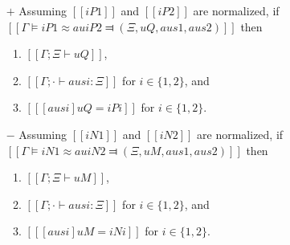 \begin{lemma} \label{lemma:anti-unification-soundness}
    \hfill
    \begin{itemize}
        \item [$+$]  Assuming $[[iP1]]$ and $[[iP2]]$ are normalized,
        if $[[Γ ⊨ iP1 ≈au iP2 ⫤ (Ξ, uQ, aus1, aus2)]]$
        then 
        \begin{enumerate}
            \item $[[Γ ; Ξ ⊢ uQ]]$,
            \item $[[Γ ; · ⊢ ausi : Ξ]]$ for $i \in \{1,2\}$, and
            \item $[[ [ausi] uQ = iPi ]]$ for $i \in \{1,2\}$.
        \end{enumerate}

        \item [$-$] Assuming $[[iN1]]$ and $[[iN2]]$ are normalized,
        if $[[Γ ⊨ iN1 ≈au iN2 ⫤ (Ξ, uM, aus1, aus2)]]$
        then
        \begin{enumerate}
            \item $[[Γ ; Ξ ⊢ uM]]$,
            \item $[[Γ ; · ⊢ ausi : Ξ]]$ for $i \in \{1,2\}$, and
            \item $[[ [ausi] uM = iNi ]]$ for $i \in \{1,2\}$.
        \end{enumerate}
    \end{itemize}
\end{lemma}

